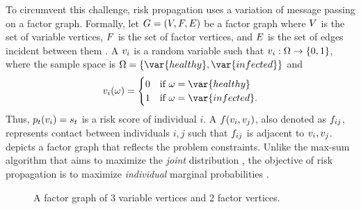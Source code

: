 To circumvent this challenge, risk propagation uses a variation of message passing on a factor graph. Formally, let $G = (V, F, E)$ be a factor graph where $V$ is the set of variable vertices, $F$ is the set of factor vertices, and $E$ is the set of edges incident between them \cite{Kschischang2001}. A  $\vVariable[i]$ is a random variable such that $\vVariable[i]: \eventSpace \rightarrow \{0, 1\}$, where the sample space is $\eventSpace = \{\var{healthy}, \var{infected}\}$ and
%
\begin{equation*}
    \vVariable[i](\event) =
        \begin{cases}
            0 & \text{if } \event = \var{healthy} \\
            1 & \text{if } \event = \var{infected}.
        \end{cases}
\end{equation*}
%
Thus, $\pr{\vVariable[i]}[\vTime] = \vScore_\vTime$ is a risk score of individual $i$. A  $\vFactor(\vVariable[i], \vVariable[j])$,  also denoted as $\vFactor[ij]$, represents contact between individuals $i, j$ such that $\vFactor[ij]$ is adjacent to $\vVariable[i], \vVariable[j]$.  depicts a factor graph that reflects the problem constraints. Unlike the max-sum algorithm that aims to maximize the \emph{joint} distribution \cite[pp. 411--415]{Bishop2006}, the objective of risk propagation is to maximize \emph{individual} marginal probabilities \cite{Ayday2021}.
%
\begin{figure}[htbp]
    \centering
    \caption[Factor graph]{A factor graph of 3 variable vertices and 2 factor vertices.}
    \label{fig:factor-graph}
\end{figure}

